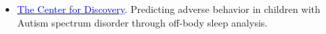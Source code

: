 \documentclass[margin, line]{res}
\newenvironment{list1}{
  \begin{list}{\ding{113}}{%
      \setlength{\itemsep}{0in}
      \setlength{\parsep}{0in} \setlength{\parskip}{0in}
      \setlength{\topsep}{0in} \setlength{\partopsep}{0in} 
      \setlength{\leftmargin}{0.17in}}}{\end{list}}
\begin{document}
\begin{resume}
\begin{list1}
\begin{itemize}
\begin{itemize}
\begin{itemize}
      \end{itemize}
            \end{itemize}
		   	
		   	\item  \href{https://thecenterfordiscovery.org}{{\textcolor{blue}{The Center for Discovery}}}. Predicting adverse behavior in children with Autism spectrum disorder through off-body sleep analysis.
          \begin{itemize}
          \begin{itemize}



\end{itemize}
\end{itemize}
\end{itemize}
\end{list1}
\end{resume}
\end{document}
